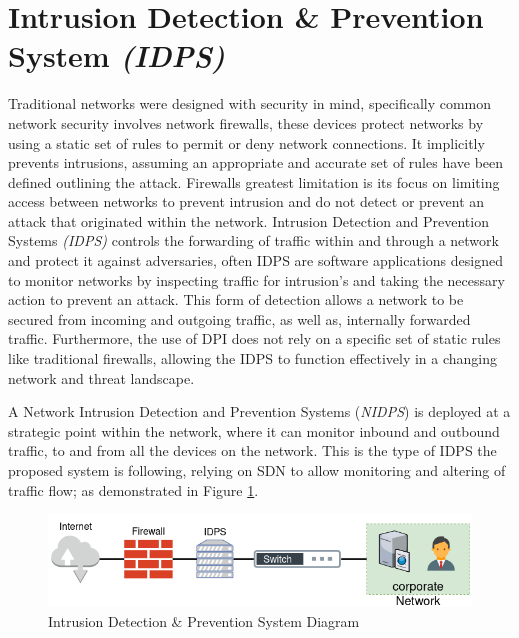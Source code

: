 \documentclass[12pt, oneside]{book}
\begin{document}

\section{Intrusion Detection \& Prevention System \emph{(IDPS)}}
\label{sec:IDPS}
Traditional networks were designed with security in mind, specifically common network security involves
network firewalls, these devices protect networks by using a static set of rules to permit or deny network connections.
It implicitly prevents intrusions, assuming an appropriate and accurate set of rules have been defined outlining the attack.
Firewalls greatest limitation is its focus on 
limiting access between networks to prevent intrusion and do not detect or prevent an attack that originated within the network.
Intrusion Detection and Prevention Systems \emph{(IDPS)} controls the forwarding of traffic within and through a network and
protect it against adversaries, often IDPS are software applications designed to monitor networks by inspecting traffic for intrusion's
and taking the necessary action to prevent an attack. This form of detection allows a network to be secured from incoming
and outgoing traffic, as well as, internally forwarded traffic. Furthermore, the use of DPI does not rely on a specific set of static rules
like traditional firewalls, allowing the IDPS to function effectively in a changing network and threat landscape\cite{kenkre2015real}.


A Network Intrusion Detection and Prevention Systems (\emph{NIDPS}) is deployed at a strategic point within the network,
where it can monitor inbound and outbound traffic, to and from all the devices on the network\cite{scarfone2012guide}.
This is the type of IDPS the proposed system is following, relying on SDN to allow monitoring and altering
of traffic flow; as demonstrated in Figure \ref{fig:idpsSys}.

\begin{figure}[H]
  \centering
  \includegraphics[scale=0.5]{images/IDPS.png}
  \caption{Intrusion Detection \& Prevention System Diagram}
  \label{fig:idpsSys}
\end{figure}
\end{document}
